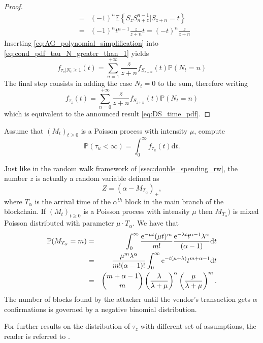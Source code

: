 \begin{proof}
\begin{eqnarray}
&=& (-1)^n\mathbb{E}\left\{S_z S_{n+z}^{n-1} \rvert S_{z+n}=t\right\} \nonumber\\
&=& (-1)^nt^{n-1}\frac{z}{z+n}t =(-t)^n\frac{z}{z+n} \label{eq:AG_polynomial_simplification}
\end{eqnarray}
Inserting \eqref{eq:AG_polynomial_simplification} into \eqref{eq:cond_pdf_tau_N_greater_than_1} yields
\begin{equation*}
f_{\tau_z|N_t\geq1}(t)=\sum_{n=1}^{+\infty}\frac{z}{z+n}f_{S_{z+n}}(t)\mathbb{P}(N_t=n)
\end{equation*}
The final step consists in adding the case $N_t=0$ to the sum, therefore writing
\begin{equation*}
f_{\tau_z}(t)=\sum_{n=0}^{+\infty}\frac{z}{z+n}f_{S_{z+n}}(t)\mathbb{P}(N_t=n)
\end{equation*}
which is equivalent to the announced result \eqref{eq:DS_time_pdf}.  
\end{proof}
\begin{exercise}
Assume that $(M_t)_{t\geq0}$ is a Poisson process with intensity $\mu$, compute 
\[
\mathbb{P}(\tau_u<\infty) = \int_0^{\infty}f_{\tau_u}(t)\text{d}t.
\]
\end{exercise}
\begin{remark}
Just like in the random walk framework of \cref{ssec:double_spending_rw}, the number $z$ is actually a random variable defined as 
$$
Z = (\alpha - M_{T_\alpha})_+,
$$
where $T_\alpha$ is the arrival time of the $\alpha^{th}$ block in the main branch of the blockchain. If $(M_t)_{t\geq0}$ is a Poisson process with intensity $\mu$ then $M_{T_\alpha})$ is mixed Poisson distributed with parameter $\mu\cdot T_{\alpha}$. We have that 
\begin{eqnarray*}
\mathbb{P}(M_{T_\alpha} = m) &=& \int_{0}^{\infty}\frac{\mathrm{e}^{-\mu t}(\mu t)^m}{m!}\frac{\mathrm{e}^{-\lambda t}t^{\alpha-1}\lambda ^\alpha}{(\alpha -1)}\text{d}t\\
&=&\frac{\mu^m\lambda^{\alpha}}{m!(\alpha-1)!}\int_{0}^{\infty}\mathrm{e}^{-t(\mu + \lambda)}t^{m+\alpha-1}\text{d}t\\
&=&\binom{m+\alpha-1}{m}\left(\frac{\lambda}{\lambda+\mu}\right)^{\alpha}\left(\frac{\mu}{\lambda+\mu}\right)^{m}.
\end{eqnarray*}
The number of blocks found by the attacker until the vendor's transaction gets $\alpha$ confirmations is governed by a negative binomial distribution.
\end{remark}
\noindent For further results on the distribution of $\tau_z$ with different set of assumptions, the reader is referred to \citet{Goffard2019}.

